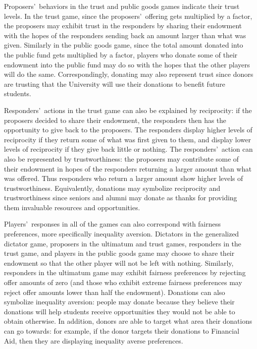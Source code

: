 \documentclass[12pt]{article}
\begin{document}
Proposers\rq \ behaviors in the trust and public goods games indicate their trust levels. In the trust game, since the proposers\rq \ offering gets multiplied by a factor, the proposers may exhibit trust in the responders by sharing their endowment with the hopes of the responders sending back an amount larger than what was given. Similarly in the public goods game, since the total amount donated into the public fund gets multiplied by a factor, players who donate some of their endowment into the public fund may do so with the hopes that the other players will do the same. Correspondingly, donating may also represent trust since donors are trusting that the University will use their donations to benefit future students.

Responders\rq \ actions in the trust game can also be explained by reciprocity: if the proposers decided to share their endowment, the responders then has the opportunity to give back to the proposers. The responders display higher levels of reciprocity if they return some of what was first given to them, and display lower levels of reciprocity if they give back little or nothing. The responders\rq \ action can also be represented by trustworthiness: the proposers may contribute some of their endowment in hopes of the responders returning a larger amount than what was offered. Thus responders who return a larger amount show higher levels of trustworthiness. Equivalently, donations may symbolize reciprocity and trustworthiness since seniors and alumni may donate as thanks for providing them invaluable resources and opportunities.

Players\rq \ responses in all of the games can also correspond with fairness preferences, more specifically inequality aversion. Dictators in the generalized dictator game, proposers in the ultimatum and trust games, responders in the trust game, and players in the public goods game may choose to share their endowment so that the other player will not be left with nothing. Similarly, responders in the ultimatum game may exhibit fairness preferences by rejecting offer amounts of zero (and those who exhibit extreme fairness preferences may reject offer amounts lower than half the endowment). Donations can also symbolize inequality aversion: people may donate because they believe their donations will help students receive opportunities they would not be able to obtain otherwise. In addition, donors are able to target what area their donations can go towards: for example, if the donor targets their donations to Financial Aid, then they are displaying inequality averse preferences.
\end{document}
